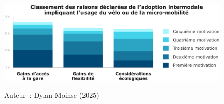 \documentclass[../main.tex]{subfiles}
\begin{document}
\begin{figure}[h!]\vspace*{10pt}
    \captionsetup{labelformat=empty, labelsep=none} %
        \label{raisons-adoption}
        \centerline{\includegraphics[width=1\columnwidth]{figures/policy-brief-raisons-adoption.pdf}}
        \vspace{3pt}
        \begin{flushright}\scriptsize{
        Auteur~: \textcolor{UGEblue}{Dylan Moinse (2025)}
        }\end{flushright}
    \end{figure}

    
\end{document}
